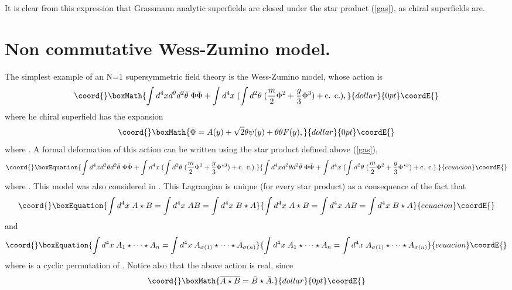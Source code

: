 \documentclass[a4paper,12pt]{article}
\begin{document}
It is clear from this expression that Grassmann analytic superfields are
 closed under the star product (\ref{gas}), as chiral superfields are.


\section{Non commutative Wess-Zumino model.}

The simplest example of an   N=1  supersymmetric 
field theory is the Wess-Zumino model, whose action is
$$\coord{}\boxMath{
\int d^4xd^\theta d^2\bar\theta\;  \Phi\bar\Phi+\int d^4x\;(\int
d^2\theta\; (\frac{m}{ 2}\Phi^2 +
\frac{g}{ 3}\Phi^3) +\mbox{c. c.}),
}{dollar}{0pt}\coordE{}$$ 
where he chiral superfield \myHighlight{$\Phi$}\coordHE{} has the expansion
$$\coord{}\boxMath{
\Phi=A(y)+\sqrt{2}\theta\psi(y) +\theta\theta F(y),
}{dollar}{0pt}\coordE{}$$
where \coordHE{}.
A formal deformation of this action can be written using the star product 
defined above (\ref{gas}),
\begin{equation}\coord{}\boxEquation{
\int d^4xd^2\theta d^2\bar\theta\; \Phi\bar\Phi+\int d^4x\;(\int d^2\theta
\;(\frac{m}{2}\Phi^2 +
\frac{g}{3}\Phi^{\star 3}) +\mbox{c. c.}).
\label{incw}
}{
\int d^4xd^2\theta d^2\bar\theta\; \Phi\bar\Phi+\int d^4x\;(\int d^2\theta
\;(\frac{m}{2}\Phi^2 +
\frac{g}{3}\Phi^{\star 3}) +\mbox{c. c.}).
}{ecuacion}\coordE{}\end{equation} 
where \coordHE{}. This model
was also considered in \cite{cr, gp}.
This Lagrangian is unique  (for every star product)
 as a consequence of the fact that
\begin{equation}\coord{}\boxEquation{
\int d^4x\;A\star B=\int d^4x\;A B=\int d^4x\;B\star A
\label{ip1}
}{
\int d^4x\;A\star B=\int d^4x\;A B=\int d^4x\;B\star A
}{ecuacion}\coordE{}\end{equation} 
and
\begin{equation}\coord{}\boxEquation{
\int d^4x\;A_1\star\cdots \star  A_n=\int d^4x\;A_{\sigma(1)}\star\cdots
\star A_{\sigma(n)}
\label{ip2}
}{
\int d^4x\;A_1\star\cdots \star  A_n=\int d^4x\;A_{\sigma(1)}\star\cdots
\star A_{\sigma(n)}
}{ecuacion}\coordE{}\end{equation}
where \myHighlight{$\sigma$}\coordHE{} is a cyclic permutation of \coordHE{}.
Notice also that the above action is real, since
$$\coord{}\boxMath{
\overline{A\star B} =\bar B\star \bar A.
}{dollar}{0pt}\coordE{}$$
\end{document}
